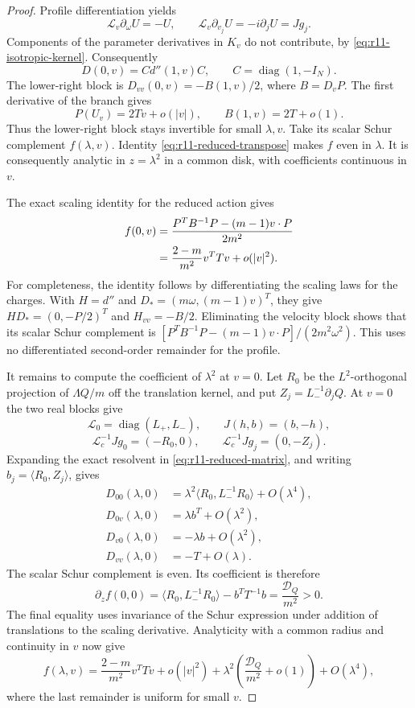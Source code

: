 \begin{proof}
Profile differentiation yields
\[
 \mathcal L_v\partial_\omega U=-U,
 \qquad
 \mathcal L_v\partial_{v_j}U=-i\partial_jU=Jg_j.
\]
Components of the parameter derivatives in $K_v$ do not contribute,
by \eqref{eq:r11-isotropic-kernel}. Consequently
\[
 D(0,v)=C d''(1,v)C,
 \qquad C=\operatorname{diag}(1,-I_N).
\]
The lower-right block is $D_{vv}(0,v)=-B(1,v)/2$, where
$B=D_vP$. The first derivative of the branch gives
\[
 P(U_v)=2Tv+o(|v|),\qquad B(1,v)=2T+o(1).
\]
Thus the lower-right block stays invertible for small $\lambda,v$.
Take its scalar Schur complement $f(\lambda,v)$. Identity
\eqref{eq:r11-reduced-transpose} makes $f$ even in $\lambda$.
It is consequently analytic in $z=\lambda^2$ in a common disk, with
coefficients continuous in $v$.

The exact scaling identity for the reduced action gives
\begin{align}
 f(0,v)
 &=\frac{P^TB^{-1}P-(m-1)v\cdot P}{2m^2}\notag\\
 &=\frac{2-m}{m^2}v^TTv+o(|v|^2).
 \label{eq:r11-f-zero}
\end{align}
For completeness, the identity follows by differentiating the scaling
laws for the charges. With $H=d''$ and
$D_*=(m\omega,(m-1)v)^T$, they give
$HD_*=(0,-P/2)^T$ and $H_{vv}=-B/2$. Eliminating the velocity block
shows that its scalar Schur complement is
$[P^TB^{-1}P-(m-1)v\cdot P]/(2m^2\omega^2)$.
This uses no differentiated second-order remainder for the profile.

It remains to compute the coefficient of $\lambda^2$ at $v=0$.
Let $R_0$ be the $L^2$-orthogonal projection of $\Lambda Q/m$ off the
translation kernel, and put $Z_j=L_-^{-1}\partial_jQ$.
At $v=0$ the two real blocks give
\[
 \mathcal L_0=\operatorname{diag}(L_+,L_-),
 \qquad J(h,b)=(b,-h),
\]
\[
 \mathcal L_c^{-1}Jg_0=(-R_0,0),
 \qquad \mathcal L_c^{-1}Jg_j=(0,-Z_j).
\]
Expanding the exact resolvent in \eqref{eq:r11-reduced-matrix}, and
writing $b_j=\langle R_0,Z_j\rangle$, gives
\begin{align*}
 D_{00}(\lambda,0)
  &=\lambda^2\langle R_0,L_-^{-1}R_0\rangle+O(\lambda^4),\\
 D_{0v}(\lambda,0)&=\lambda b^T+O(\lambda^2),\\
 D_{v0}(\lambda,0)&=-\lambda b+O(\lambda^2),\\
 D_{vv}(\lambda,0)&=-T+O(\lambda).
\end{align*}
The scalar Schur complement is even. Its coefficient is therefore
\[
 \partial_z f(0,0)=
 \langle R_0,L_-^{-1}R_0\rangle-b^TT^{-1}b
 =\frac{\mathcal D_Q}{m^2}>0.
\]
The final equality uses invariance of the Schur expression under
addition of translations to the scaling derivative. Analyticity with
a common radius and continuity in $v$ now give
\[
 f(\lambda,v)=\frac{2-m}{m^2}v^TTv+o(|v|^2)
 +\lambda^2\left(\frac{\mathcal D_Q}{m^2}+o(1)\right)
 +O(\lambda^4),
\]
where the last remainder is uniform for small $v$.


\end{proof}

